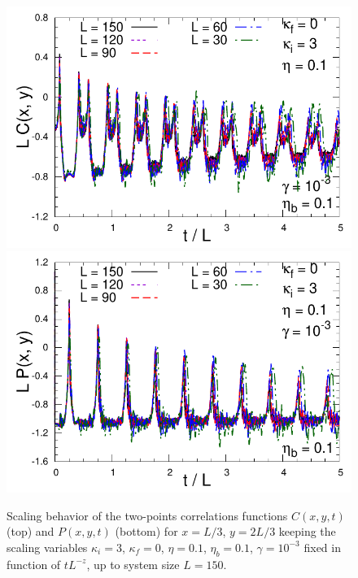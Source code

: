 \documentclass[pra,twocolumn,preprintnumbers,amsmath,amssymb,nofootinbib,floatfix,longbibliography]{revtex4}
\begin{document}
\begin{figure}[!htb]
  \includegraphics[width=0.95\columnwidth]
    {figs/LCk3q0e010t010g0001.pdf}
  \includegraphics[width=0.95\columnwidth]
    {figs/LPk3q0e010t010g0001.pdf}
  \caption{Scaling behavior of the two-points
    correlations functions $C(x,y,t)$ (top) and $P(x,y,t)$
    (bottom) for $x=L/3$, $y=2L/3$  keeping the scaling
    variables $\kappa_i=3$, $\kappa_f=0$, $\eta=0.1$,
    $\eta_b=0.1$, $\gamma=10^{-3}$ fixed in function of
    $tL^{-z}$, up to system size $L=150$.}
  \label{k3q0e010t010g0001}
\end{figure}
\end{document}
